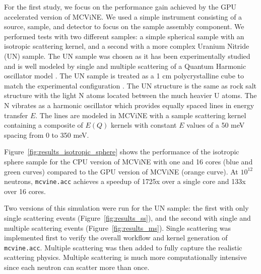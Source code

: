 For the first study, we focus on the performance gain achieved by the GPU accelerated version of MCViNE.
We used a simple instrument consisting of a source, sample, and detector to focus on the sample assembly component. 
We performed tests with two different samples: a simple spherical sample with an isotropic scattering kernel, and a second with a more complex Uranium Nitride (UN) sample.
The UN sample was chosen as it has been experimentally studied and is well modeled by single and multiple scattering of a Quantum Harmonic oscillator model \cite{aczel2012quantum,lin2014UN}.
The UN sample is treated as a 1 cm polycrystalline cube to match the experimental configuration \cite{aczel2012quantum}.
The UN structure is the same as  rock salt structure with the light N atoms located between the much heavier U atoms.  
The N vibrates as a harmonic oscillator which provides equally spaced lines in energy transfer $E$.
The lines are modeled in MCViNE with a sample scattering kernel containing a composite of $E(Q)$ kernels with constant $E$ values of a 50 meV spacing from 0 to 350 meV.

Figure~\ref{fig:results_isotropic_sphere} shows the performance of the isotropic sphere sample for the CPU version of MCViNE with one and 16 cores (blue and green curves) compared to the GPU version of MCViNE (orange curve). At $10^{12}$ neutrons, \texttt{mcvine.acc} achieves a speedup of 1725x over a single core and 133x over 16 cores.


Two versions of this simulation were run for the UN sample: the first with only single scattering events (Figure~\ref{fig:results_ss}), and the second with single and multiple scattering events (Figure~\ref{fig:results_ms}).
Single scattering was implemented first to verify the overall workflow and kernel generation of \texttt{mcvine.acc}. Multiple scattering was then added to fully capture the realistic scattering physics.
Multiple scattering is much more computationally intensive since each neutron can scatter more than once.

